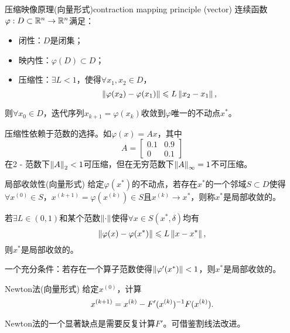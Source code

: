 \begin{theorem}
    {压缩映像原理(向量形式)}{contraction mapping principle (vector)}
    连续函数$\varphi:D\subset\mathbb R^n\to\mathbb R^n$满足：
    \begin{itemize}
        \item 闭性：$D$是闭集；
        \item 映内性：$\varphi(D)\subset D$；
        \item 压缩性：$\exists L<1$，使得$\forall x_1,x_2\in D$，
        \[
            \left\lVert\varphi(x_2)-\varphi(x_1)\right\rVert\leqslant L\left\lVert x_2-x_1\right\rVert,
        \]
    \end{itemize}
    则$\forall x_0\in D$，迭代序列$x_{k+1}=\varphi(x_k)$收敛到$\varphi$唯一的不动点$x^*$。
\end{theorem}

\begin{remark}
    压缩性依赖于范数的选择。如$\varphi(x)=Ax$，其中
    \[
        A=\begin{bmatrix}
            0.1&0.9\\0&0.1
        \end{bmatrix}
    \]
    在2 - 范数下$\left\lVert A\right\rVert_2<1$可压缩，但在无穷范数下$\left\lVert A\right\rVert_\infty=1$不可压缩。
\end{remark}

\begin{definition}
    {局部收敛性(向量形式)}{}
    给定$\varphi(x^*)$的不动点，若存在$x^*$的一个邻域$S\subset D$使得$\forall x^{(0)}\in S$，$x^{(k+1)}=\varphi(x^{(k)})\in S$且$x^{(k)}\to x^*$，则称$x^*$是局部收敛的。
\end{definition}

\begin{theorem}
    {}{}
    若$\exists L\in(0,1)$和某个范数$\left\lVert\cdot\right\rVert$使得$\forall x\in S(x^*,\delta)$均有
    \[
        \left\lVert\varphi(x)-\varphi(x^*)\right\rVert\leqslant L\left\lVert x-x^*\right\rVert,
    \]
    则$x^*$是局部收敛的。
\end{theorem}

\begin{corollary}
    一个充分条件：若存在一个算子范数使得$\left\lVert\varphi'(x^*)\right\rVert<1$，则$x^*$是局部收敛的。
\end{corollary}

\begin{theorem}
    {Newton法(向量形式)}{}
    给定$x^{(0)}$，计算 
    \[
        x^{(k+1)}=x^{(k)}-F'(x^{(k)})^{-1} F(x^{(k)}).
    \]
\end{theorem}

\begin{remark}
    Newton法的一个显著缺点是需要反复计算$F'$。可借鉴割线法改进。
\end{remark}

